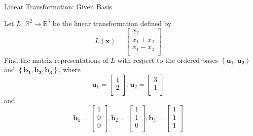 \documentclass{beamer}
\begin{document}
\begin{frame}{Linear Transformation: Given Basis}
\begin{example}
Let $L$: $\mathbb{R}^2\rightarrow \mathbb{R}^3$ be the linear transformation defined by
\begin{equation*}
    L\left( \mathbf{x} \right) =\left[ \begin{array}{c}
        x_2\\
        x_1+x_2\\
        x_1-x_2\\
    \end{array} \right]
\end{equation*}
Find the matrix representations of $L$ with respect to the ordered bases $\left\{ \mathbf{u}_{\mathbf{1}},\mathbf{u}_{\mathbf{2}} \right\}$ and $\left\{ \mathbf{b}_{\mathbf{1}},\mathbf{b}_{\mathbf{2}},\mathbf{b}_{\mathbf{3}} \right\}$, where
\begin{equation*}
    \mathbf{u}_{\mathbf{1}}=\left[ \begin{array}{c}
        1\\
        2\\
    \end{array} \right] , \mathbf{u}_2=\left[ \begin{array}{c}
        3\\
        1\\
    \end{array} \right]
\end{equation*}
\vspace{-2pt}
and
\vspace{-2pt}
\begin{equation*}
    \mathbf{b}_{\mathbf{1}}=\left[ \begin{array}{c}
        1\\
        0\\
        0\\
    \end{array} \right] , \mathbf{b}_2=\left[ \begin{array}{c}
        1\\
        1\\
        0\\
    \end{array} \right], \mathbf{b}_3=\left[ \begin{array}{c}
        1\\
        1\\
        1\\
    \end{array} \right]
\end{equation*}
\end{example}
\end{frame}
\end{document}
